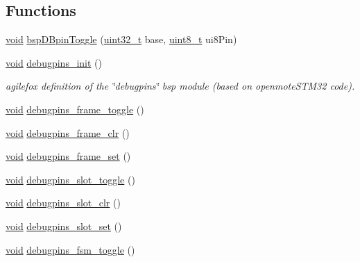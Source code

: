 \subsection*{Functions}
\begin{DoxyCompactItemize}
\item 
\hyperlink{usb__devapi_8h_afabf60e7f57651d6d595a02c75f07cd0}{void} \hyperlink{_open_mote-_c_c2538_2debugpins_8c_a85ae76895e36e10a96fa15b8e997f291}{bsp\+D\+Bpin\+Toggle} (\hyperlink{_p_e___types_8h_a33594304e786b158f3fb30289278f5af}{uint32\+\_\+t} base, \hyperlink{_p_e___types_8h_aba7bc1797add20fe3efdf37ced1182c5}{uint8\+\_\+t} ui8\+Pin)
\item 
\hyperlink{usb__devapi_8h_afabf60e7f57651d6d595a02c75f07cd0}{void} \hyperlink{group__debugpins_ga67b42e8786576ba76a5dbfd6b61bbf90}{debugpins\+\_\+init} ()
\begin{DoxyCompactList}\small\item\em agilefox definition of the \char`\"{}debugpins\char`\"{} bsp module (based on openmote\+S\+T\+M32 code). \end{DoxyCompactList}\item 
\hyperlink{usb__devapi_8h_afabf60e7f57651d6d595a02c75f07cd0}{void} \hyperlink{group__debugpins_gaf5f2b7fbde11bd076c0c3e867653fa08}{debugpins\+\_\+frame\+\_\+toggle} ()
\item 
\hyperlink{usb__devapi_8h_afabf60e7f57651d6d595a02c75f07cd0}{void} \hyperlink{group__debugpins_gada37390552bee362863d82aa858f7aed}{debugpins\+\_\+frame\+\_\+clr} ()
\item 
\hyperlink{usb__devapi_8h_afabf60e7f57651d6d595a02c75f07cd0}{void} \hyperlink{group__debugpins_ga2a1a3edef66d4588cb179ee254935790}{debugpins\+\_\+frame\+\_\+set} ()
\item 
\hyperlink{usb__devapi_8h_afabf60e7f57651d6d595a02c75f07cd0}{void} \hyperlink{group__debugpins_gaa50950bd15a2a2ad12412ab5fbf0eb12}{debugpins\+\_\+slot\+\_\+toggle} ()
\item 
\hyperlink{usb__devapi_8h_afabf60e7f57651d6d595a02c75f07cd0}{void} \hyperlink{group__debugpins_ga46be7a970bd088dbf58868c806a90ff6}{debugpins\+\_\+slot\+\_\+clr} ()
\item 
\hyperlink{usb__devapi_8h_afabf60e7f57651d6d595a02c75f07cd0}{void} \hyperlink{group__debugpins_ga7707a462a0287f9c35fd70cd7ffbfa6a}{debugpins\+\_\+slot\+\_\+set} ()
\item 
\hyperlink{usb__devapi_8h_afabf60e7f57651d6d595a02c75f07cd0}{void} \hyperlink{group__debugpins_gaa140c9166f959c8bf59b2a5053e7318f}{debugpins\+\_\+fsm\+\_\+toggle} ()

\end{DoxyCompactItemize}
